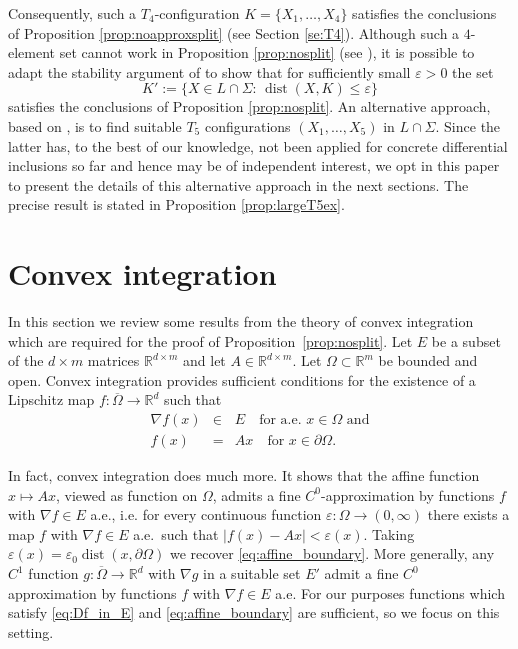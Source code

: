 \documentclass[titlepage]{amsart}
\numberwithin{equation}{section}
\theoremstyle{plain}
\theoremstyle{definition}
\theoremstyle{remark}
\newcommand{\dist}{\operatorname{dist}}
\newcommand{\eps}{\varepsilon}
\newcommand{\R}{\mathbb{R}}
\newcommand{\g}{\nabla }
\begin{document}
Consequently, such a $T_4$-configuration $K=\{X_1,\dots,X_4\}$ satisfies
 the conclusions of Proposition \ref{prop:noapproxsplit} (see Section \ref{se:T4}). 
 Although such a $4$-element set cannot work in Proposition  \ref{prop:nosplit} (see \cite{Chlebik:2002va}), 
 it is possible to adapt the stability argument of \cite{muller_sverak03} to show that for sufficiently small $\varepsilon>0$ the set 
$$
K':=\bigl\{X\in L\cap\Sigma:\,\dist(X,K)\leq \varepsilon\bigr\}
$$   
satisfies the conclusions of Proposition  \ref{prop:nosplit}.
An alternative approach, based on \cite{szekelyhidi_forster18}, is to find suitable $T_5$ configurations $(X_1,\dots,X_5)$ in $L\cap\Sigma$. 
Since the latter has, to the best of our knowledge, not been applied 
for concrete differential inclusions so far and hence may be of independent interest, 
we opt in this paper to present the details of this alternative approach in the next sections. The precise result is stated in Proposition \ref{prop:largeT5ex}.



\section{Convex integration}  \label{se:convex_integration}



 In this section we review some results from  the theory of convex integration  which are required for the proof of Proposition~\ref{prop:nosplit}.
Let $E$ be a subset of the $ d\times m$ matrices  $\R^{d \times m}$ and let $A \in \R^{d \times m}$.
Let $\Omega \subset \R^m$ be bounded and open. 
Convex integration provides sufficient conditions for the existence of a Lipschitz map $f: \overline \Omega \to \R^d$
such that
\begin{eqnarray}  \label{eq:Df_in_E} \g f(x) &\in& E \quad \text{for a.e. $x \in \Omega$ and}\\
 \label{eq:affine_boundary}
f(x) &=& Ax \quad \text{for $x \in \partial \Omega$.}
\end{eqnarray}

In fact,  convex integration does much more. It shows that the affine function $x \mapsto Ax$, viewed as  function 
on $ \Omega$, admits a fine $C^0$-approximation by functions $f$ with $\g f \in E$ a.e., i.e. for every continuous function 
$\eps: \Omega \to (0, \infty)$ there exists a map $f$  with $\g f \in E$ a.e.\ such that $|f(x) - Ax| < \eps(x)$. Taking  $\eps(x) = \eps_0 \dist(x, \partial
\Omega)$ we recover  \eqref{eq:affine_boundary}.
More generally,  any $C^1$ function $g: \overline{\Omega} \to \R^d$ with $\g g$ in a suitable set $E'$ admit a fine $C^0$ approximation by functions $f$ with $\g f \in E$ a.e.
For our purposes functions which satisfy  \eqref{eq:Df_in_E}  and \eqref{eq:affine_boundary} are sufficient, so we focus on this setting. 
\end{document}
